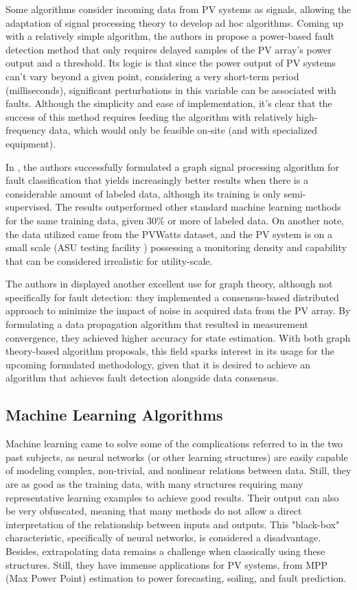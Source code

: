 Some algorithms consider incoming data from PV systems as signals, allowing the adaptation of signal processing theory to develop ad hoc algorithms. Coming up with a relatively simple algorithm, the authors in \cite{Iles2021} propose a power-based fault detection method that only requires delayed samples of the PV array's power output and a threshold. Its logic is that since the power output of PV systems can't vary beyond a given point, considering a very short-term period (milliseconds), significant perturbations in this variable can be associated with faults. Although the simplicity and ease of implementation, it's clear that the success of this method requires feeding the algorithm with relatively high-frequency data, which would only be feasible on-site (and with specialized equipment).

In \cite{Fan2020}, the authors successfully formulated a graph signal processing algorithm for fault classification that yields increasingly better results when there is a considerable amount of labeled data, although its training is only semi-supervised. The results outperformed other standard machine learning methods for the same training data, given 30\% or more of labeled data. On another note, the data utilized came from the PVWatts \cite{Dobos2013} dataset, and the PV system is on a small scale (ASU testing facility \cite{Rao2016}) possessing a monitoring density and capability that can be considered irrealistic for utility-scale.

The authors in \cite{Katoch2018} displayed another excellent use for graph theory, although not specifically for fault detection: they implemented a consensus-based distributed approach to minimize the impact of noise in acquired data from the PV array. By formulating a data propagation algorithm that resulted in measurement convergence, they achieved higher accuracy for state estimation. With both graph theory-based algorithm proposals, this field sparks interest in its usage for the upcoming formulated methodology, given that it is desired to achieve an algorithm that achieves fault detection alongside data consensus.


\subsection{Machine Learning Algorithms} \label{subsec:machinelearning}

Machine learning came to solve some of the complications referred to in the two past subjects, as neural networks (or other learning structures) are easily capable of modeling complex, non-trivial, and nonlinear relations between data. Still, they are as good as the training data, with many structures requiring many representative learning examples to achieve good results. Their output can also be very obfuscated, meaning that many methods do not allow a direct interpretation of the relationship between inputs and outputs. This "black-box" characteristic, specifically of neural networks, is considered a disadvantage. Besides, extrapolating data remains a challenge when classically using these structures. Still, they have immense applications for PV systems, from MPP (Max Power Point) estimation to power forecasting, soiling, and fault prediction.

